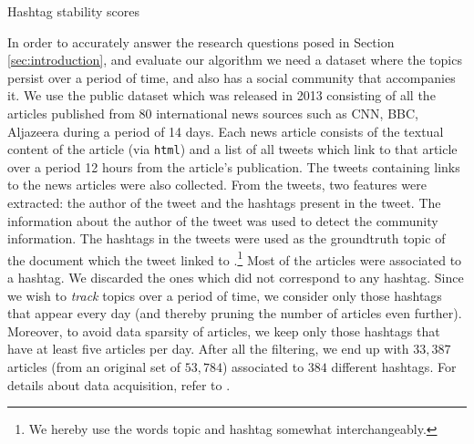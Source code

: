 %
\begin{algorithm}
\caption{Hashtag stability scores}
 \label{alg:hashtag_stability_scores}
\end{algorithm}
\vspace{-0.4cm}
In order to accurately answer the research questions posed in Section \ref{sec:introduction}, and evaluate
our algorithm we need a dataset where the topics persist over a period of time, 
and also has a social community that accompanies it.   
We use the public dataset which was released in 2013 \cite{YatesTrumper:2013} consisting of all the articles published from 80 international 
news sources such as CNN, BBC, Aljazeera during a period of 14 days. Each news article consists of the textual content
of the article (via \texttt{html}) and a list of all tweets which link to that article over a period 
12 hours from the article's publication. The tweets containing links 
to the news articles were also collected.  From the tweets, two features were extracted: 
the author of the tweet and the hashtags present in the tweet.  The information about the author
of the tweet was used to detect the community information.  The hashtags in the tweets
were used as the groundtruth topic of the document which the tweet linked to \cite{Tsur:2012}.\footnote{We hereby use the words topic and hashtag somewhat interchangeably.}
Most of the articles were associated to a hashtag.  We discarded the ones which did not correspond to any hashtag.  
Since we wish to \emph{track} topics over
a period of time, we consider only those hashtags that appear every day (and thereby pruning 
the number of articles even further). Moreover, to avoid data sparsity of articles, 
we keep only those hashtags that have at least five articles per day. 
After all the filtering, we end up with $33,387$ articles (from an original set of $53,784$)  associated to $384$ different hashtags.
For details about
data acquisition, refer to \cite{YatesTrumper:2013}.
